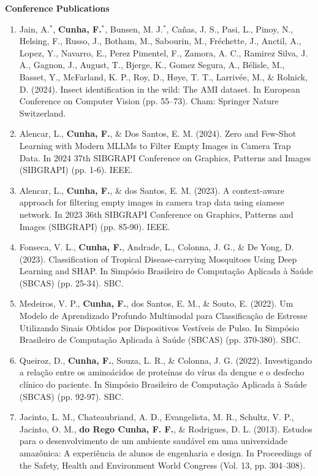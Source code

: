 \documentclass[10pt]{developercv} %
\begin{document}
\textbf{Conference Publications}

\begin{enumerate}
 \item Jain, A.$^\ast$, \textbf{Cunha, F.$^\ast$}, Bunsen, M. J.$^\ast$, Cañas,
J. S., Pasi, L., Pinoy, N., Helsing, F., Russo, J., Botham, M., Sabourin, M.,
Fréchette, J., Anctil, A., Lopez, Y., Navarro, E., Perez Pimentel, F., Zamora,
A. C., Ramirez Silva, J. A., Gagnon, J., August, T., Bjerge, K., Gomez Segura,
A., Bélisle, M., Basset, Y., McFarland, K. P., Roy, D., Høye, T. T., Larrivée,
M., \& Rolnick, D. (2024). Insect identification in the wild: The AMI dataset.
In European Conference on Computer Vision (pp. 55–73). Cham: Springer Nature
Switzerland.

 \item Alencar, L., \textbf{Cunha, F.}, \& Dos Santos, E. M. (2024). Zero and
Few-Shot Learning with Modern MLLMs to Filter Empty Images in Camera Trap Data.
In 2024 37th SIBGRAPI Conference on Graphics, Patterns and Images (SIBGRAPI)
(pp. 1-6). IEEE.

 \item Alencar, L., \textbf{Cunha, F.}, \& dos Santos, E. M. (2023). A
context-aware approach for filtering empty images in camera trap data using
siamese network. In 2023 36th SIBGRAPI Conference on Graphics, Patterns and
Images (SIBGRAPI) (pp. 85-90). IEEE.

 \item Fonseca, V. L., \textbf{Cunha, F.}, Andrade, L., Colonna, J. G., \& De
Yong, D. (2023). Classification of Tropical Disease-carrying Mosquitoes Using
Deep Learning and SHAP. In Simpósio Brasileiro de Computação Aplicada à Saúde
(SBCAS) (pp. 25-34). SBC.

 \item Medeiros, V. P., \textbf{Cunha, F.}, dos Santos, E. M., \& Souto, E.
(2022). Um Modelo de Aprendizado Profundo Multimodal para Classificação de
Estresse Utilizando Sinais Obtidos por Dispositivos Vestíveis de Pulso. In
Simpósio Brasileiro de Computação Aplicada à Saúde (SBCAS) (pp. 370-380). SBC.

 \item Queiroz, D., \textbf{Cunha, F.}, Souza, L. R., \& Colonna, J. G. (2022).
Investigando a relação entre os aminoácidos de proteínas do vírus da dengue e o
desfecho clínico do paciente. In Simpósio Brasileiro de Computação Aplicada à
Saúde (SBCAS) (pp. 92-97). SBC.

 \item Jacinto, L. M., Chateaubriand, A. D., Evangelista, M. R., Schultz, V. P.,
Jacinto, O. M., \textbf{do Rego Cunha, F. F.}, \& Rodrigues, D. L. (2013).
Estudos para o desenvolvimento de um ambiente saudável em uma universidade
amazônica: A experiência de alunos de engenharia e design. In Proceedings of the
Safety, Health and Environment World Congress (Vol. 13, pp. 304–308). \\
\end{enumerate}
\end{document}
